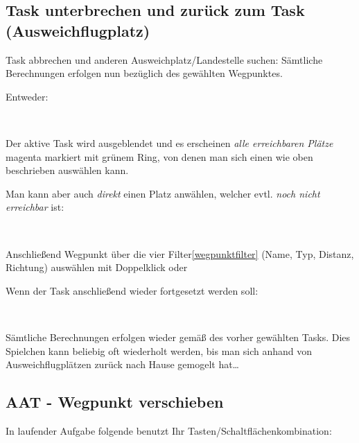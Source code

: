 \subsection{Task unterbrechen und zurück zum Task (Ausweichflugplatz)}
Task abbrechen und anderen Ausweichplatz/Landestelle suchen:
Sämtliche Berechnungen  erfolgen nun bezüglich des gewählten Wegpunktes.

Entweder:

\blink~\blink~ \bblitz

Der aktive Task wird ausgeblendet und es erscheinen \textsl{alle erreichbaren Plätze} magenta markiert mit grünem Ring, von denen man sich einen wie oben beschrieben auswählen kann.

Man kann aber auch \textsl{direkt} einen Platz anwählen, welcher evtl. \textsl{noch nicht erreichbar} ist:

\blink~\blink~ \bblitz

Anschließend Wegpunkt über die vier Filter\ref{wegpunktfilter} (Name, Typ, Distanz, Richtung) auswählen mit Doppelklick oder  \blink~

Wenn der Task anschließend wieder fortgesetzt werden soll:

 \blink~ \blink~ \bblitz


Sämtliche Berechnungen erfolgen wieder gemäß des vorher gewählten Tasks.
Dies Spielchen kann beliebig oft wiederholt werden, bis man sich anhand von
Ausweichflugplätzen zurück nach  Hause gemogelt hat\dots
\subsection{AAT - Wegpunkt verschieben}
In laufender Aufgabe folgende benutzt Ihr Tasten/Schaltflächenkombination:

